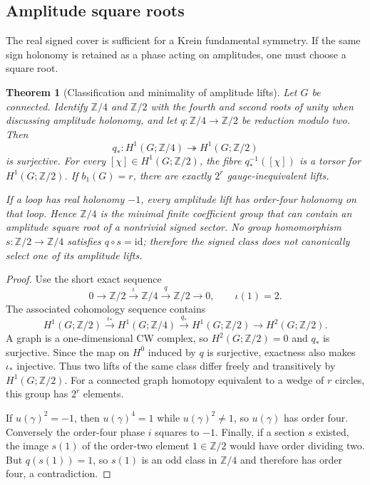 \documentclass[11pt]{article}
\newtheorem{theorem}{Theorem}[section]
\theoremstyle{definition}
\theoremstyle{remark}
\newcommand{\id}{\mathrm{id}}
\newcommand{\Ztwo}{\mathbb Z/2}
\newcommand{\Zfour}{\mathbb Z/4}
\begin{document}
\subsection{Amplitude square roots}

The real signed cover is sufficient for a Krein fundamental symmetry.  If the
same sign holonomy is retained as a phase acting on amplitudes, one must choose
a square root.

\begin{theorem}[Classification and minimality of amplitude lifts]
\label{prop:z4-lift}
Let $G$ be connected.  Identify $\Zfour$ and $\Ztwo$ with the fourth and
second roots of unity when discussing amplitude holonomy, and let
$q:\Zfour\to\Ztwo$ be reduction modulo two.  Then
\[
 q_*:H^1(G;\Zfour)\twoheadrightarrow H^1(G;\Ztwo)
\]
is surjective.  For every $[\chi]\in H^1(G;\Ztwo)$, the fibre
$q_*^{-1}([\chi])$ is a torsor for $H^1(G;\Ztwo)$.  If
$b_1(G)=r$, there are exactly $2^r$ gauge-inequivalent lifts.

If a loop has real holonomy $-1$, every amplitude lift has order-four holonomy
on that loop.  Hence $\Zfour$ is the minimal finite coefficient group that can
contain an amplitude square root of a nontrivial signed sector.  No group
homomorphism $s:\Ztwo\to\Zfour$ satisfies $q\circ s=\id$; therefore the signed
class does not canonically select one of its amplitude lifts.
\end{theorem}

\begin{proof}
Use the short exact sequence
\[
 0\longrightarrow\Ztwo\xrightarrow{\,\iota\,}\Zfour
 \xrightarrow{\,q\,}\Ztwo\longrightarrow0,
 \qquad \iota(1)=2.
\]
The associated cohomology sequence contains
\[
 H^1(G;\Ztwo)\xrightarrow{\iota_*}H^1(G;\Zfour)
 \xrightarrow{q_*}H^1(G;\Ztwo)
 \longrightarrow H^2(G;\Ztwo).
\]
A graph is a one-dimensional CW complex, so $H^2(G;\Ztwo)=0$ and $q_*$ is
surjective.  Since the map on $H^0$ induced by $q$ is surjective, exactness also
makes $\iota_*$ injective.  Thus two lifts of the same class differ freely and
transitively by $H^1(G;\Ztwo)$.  For a connected graph homotopy equivalent to a
wedge of $r$ circles, this group has $2^r$ elements.

If $u(\gamma)^2=-1$, then $u(\gamma)^4=1$ while
$u(\gamma)^2\ne1$, so $u(\gamma)$ has order four.  Conversely the order-four
phase $i$ squares to $-1$.  Finally, if a section $s$ existed, the image $s(1)$ of the order-two
element $1\in\Ztwo$ would have order dividing two.  But
$q(s(1))=1$, so $s(1)$ is an odd class in $\Zfour$ and therefore has order
four, a contradiction.
\end{proof}
\end{document}
